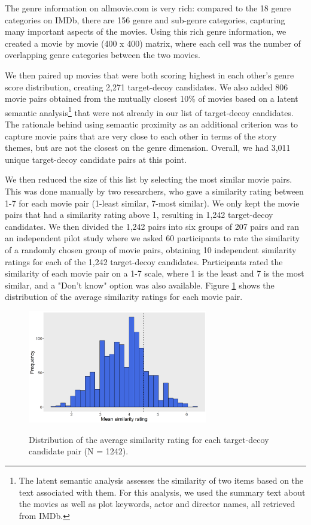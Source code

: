 \documentclass[12pt, a4paper]{article}
\begin{document}
 The genre information on allmovie.com is very rich: compared to the 18 genre categories on IMDb, there are 156 genre and sub-genre categories, capturing many important aspects of the movies. Using this rich genre information, we created a movie by movie (400 x 400) matrix, where each cell was the number of overlapping genre categories between the two movies. 

We then paired up movies that were both scoring highest in each other's genre score distribution, creating 2,271 target-decoy candidates. We also added 806 movie pairs obtained from the mutually closest 10\% of movies based on a latent semantic analysis\footnote{The latent semantic analysis assesses the similarity of two items based on the text associated with them. For this analysis, we used the summary text about the movies as well as plot keywords, actor and director names, all retrieved from IMDb.} that were not already in our list of target-decoy candidates. The rationale behind using semantic proximity as an additional criterion was to capture movie pairs that are very close to each other in terms of the story themes, but are not the closest on the genre dimension. Overall, we had 3,011 unique target-decoy candidate pairs at this point. 

We then reduced the size of this list by selecting the most similar movie pairs. This was done manually by two researchers, who gave a similarity rating between 1-7 for each movie pair (1-least similar, 7-most similar). We only kept the movie pairs that had a similarity rating above 1, resulting in 1,242 target-decoy candidates. We then divided the 1,242 pairs into six groups of 207 pairs and ran an independent pilot study where we asked 60 participants to rate the similarity of a randomly chosen group of movie pairs, obtaining 10 independent similarity ratings for each of the 1,242 target-decoy candidates. Participants rated the similarity of each movie pair on a 1-7 scale, where 1 is the least and 7 is the most similar, and a "Don't know" option was also available. Figure \ref{fig:exp2_pilot}  shows the distribution of the average similarity ratings for each movie pair. 

 \begin{figure}[htb!]
\centering
\captionsetup{justification=centering}
\caption{Distribution of the average similarity rating for each target-decoy candidate pair (N = 1242).}
\includegraphics[width=0.7\textwidth]{exp2_pilot.png}
\label{fig:exp2_pilot}
\end{figure}
\end{document}
